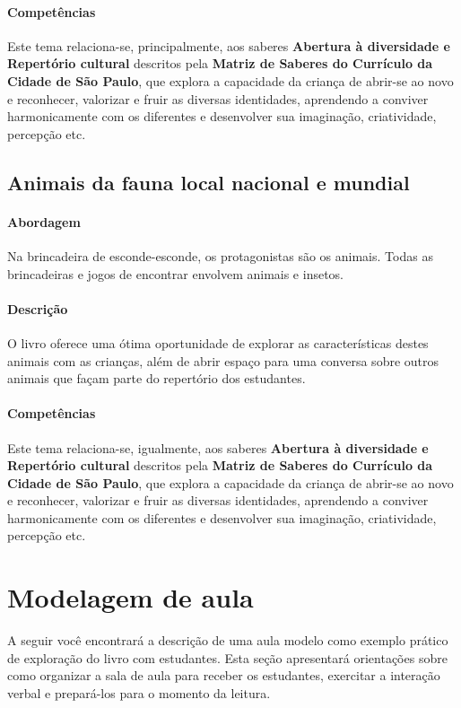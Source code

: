 \documentclass[11pt]{extarticle}
\begin{document}
\paragraph{Competências} Este tema relaciona-se, principalmente, aos saberes \textbf{Abertura à diversidade e Repertório cultural} descritos pela \textbf{Matriz de Saberes do Currículo da Cidade de São Paulo}, que explora a capacidade da criança de abrir-se ao novo e reconhecer, valorizar e fruir as diversas identidades, aprendendo a conviver harmonicamente com os diferentes e desenvolver sua imaginação, criatividade, percepção etc.

\subsection{Animais da fauna local nacional e mundial}

\paragraph{Abordagem} Na brincadeira de esconde-esconde, os protagonistas são os animais. 
Todas as brincadeiras e jogos de encontrar envolvem animais e insetos.

\paragraph{Descrição} O livro oferece uma ótima oportunidade de explorar 
as características destes animais com as crianças, além de abrir espaço para uma 
conversa sobre outros animais que façam parte do repertório dos estudantes. 

\paragraph{Competências} Este tema relaciona-se, igualmente, aos saberes \textbf{Abertura à diversidade e Repertório cultural} descritos pela \textbf{Matriz de Saberes do Currículo da Cidade de São Paulo}, que explora a capacidade da criança de abrir-se ao novo e reconhecer, valorizar e fruir as diversas identidades, aprendendo a conviver harmonicamente com os diferentes e desenvolver sua imaginação, criatividade, percepção etc.

\section{Modelagem de aula}
A seguir você encontrará a descrição de uma aula modelo como exemplo 
prático de exploração do livro com estudantes. Esta seção apresentará 
orientações sobre como organizar a sala de aula para receber os 
estudantes, exercitar a interação verbal e prepará-los para o 
momento da leitura.
\end{document}
